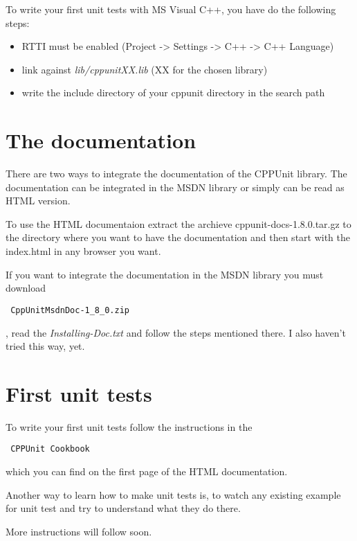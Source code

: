 To write your first unit tests with MS Visual C++, you have do the following %
steps:
\begin{itemize}
\item RTTI must be enabled (Project -> Settings -> C++ -> C++ Language)
\item link against \textit{lib/cppunitXX.lib} (XX for the chosen library)
\item write the include directory of your cppunit directory in the search path
\end{itemize}

\section{The documentation}

There are two ways to integrate the documentation of the CPPUnit library. The %
documentation can be integrated in the MSDN library or simply can be read as %
HTML version.

To use the HTML documentaion extract the archieve cppunit-docs-1.8.0.tar.gz to %
the directory where you want to have the documentation and then start with the %
index.html in any browser you want.

If you want to integrate the documentation in the MSDN library you must %
download \begin{verbatim} CppUnitMsdnDoc-1_8_0.zip \end{verbatim}, read the %
\textit{Installing-Doc.txt} and follow the steps mentioned there.
I also haven't tried this way, yet.

\section{First unit tests}

To write your first unit tests follow the instructions in the
\begin{verbatim} CPPUnit Cookbook \end{verbatim} which you can find on the first page of
the HTML documentation.

Another way to learn how to make unit tests is, to watch any existing example %
for unit test and try to understand what they do there.

More instructions will follow soon.
